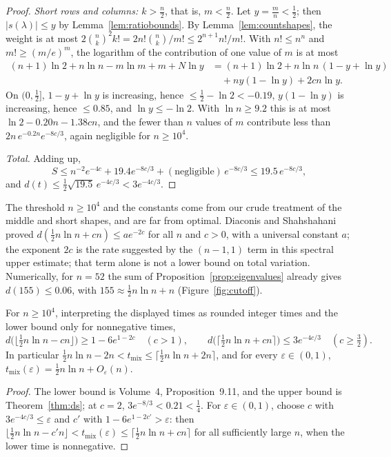 \begin{proof}
\emph{Short rows and columns: $k>\frac n2$}, that is, $m<\frac n2$. Let $y=\frac mn<\frac12$; then $|s(\lambda)|\le y$ by Lemma~\ref{lem:ratiobounds}. By Lemma~\ref{lem:countshapes}, the weight is at most $2\binom nk^2k!=2n!\binom nk/m!\le2^{n+1}n!/m!$. With $n!\le n^n$ and
$m!\ge(m/e)^m$, the logarithm of the contribution of one value of $m$ is at most
\[
\begin{aligned}(n+1)\ln2+n\ln n-m\ln m+m+N\ln y&=(n+1)\ln2+n\ln n\,(1-y+\ln y)\\&\quad+ny(1-\ln y)+2cn\ln y.\end{aligned}
\]
On $(0,\frac12]$, $1-y+\ln y$ is increasing, hence $\le\frac12-\ln2<-0.19$, $y(1-\ln y)$ is increasing, hence $\le0.85$, and $\ln y\le-\ln2$. With $\ln n\ge9.2$ this is at most $\ln2-0.20n-1.38cn$, and the fewer than $n$ values of $m$ contribute
less than $2n\,e^{-0.2n}e^{-8c/3}$, again negligible for $n\ge10^4$.

\emph{Total.} Adding up,
\[
S\le n^{-2}e^{-4c}+19.4e^{-8c/3}+(\text{negligible})\,e^{-8c/3}\le19.5\,e^{-8c/3},
\]
and $d(t)\le\frac12\sqrt{19.5}\,e^{-4c/3}<3e^{-4c/3}$.
\end{proof}

The threshold $n\ge10^4$ and the constants come from our crude treatment of the middle and short shapes, and are far from optimal. Diaconis and Shahshahani proved $d(\frac12n\ln n+cn)\le ae^{-2c}$ for all $n$ and $c>0$, with a universal constant $a$; the exponent $2c$
is the rate suggested by the $(n-1,1)$ term in this spectral upper estimate; that term alone is not a lower bound on total variation. Numerically, for $n=52$ the sum of Proposition~\ref{prop:eigenvalues} already gives $d(155)\le0.06$, with $155\approx\frac12n\ln n+n$ (Figure~\ref{fig:cutoff}).

\begin{corollary}\label{cor:cutoff}
For $n\ge10^4$, interpreting the displayed times as rounded integer times and the lower bound only for nonnegative times,
\[
d\bigl(\lfloor\tfrac12n\ln n-cn\rfloor\bigr)\ge1-6e^{1-2c}\quad(c>1),\qquad d\bigl(\lceil\tfrac12n\ln n+cn\rceil\bigr)\le3e^{-4c/3}\quad(c\ge\tfrac32).
\]
In particular $\frac12n\ln n-2n<t_{\mathrm{mix}}\le\lceil\frac12n\ln n+2n\rceil$, and for every $\varepsilon\in(0,1)$, $t_{\mathrm{mix}}(\varepsilon)=\frac12n\ln n+O_\varepsilon(n)$.
\end{corollary}

\begin{proof}
The lower bound is Volume~4, Proposition~9.11, and the upper bound is Theorem~\ref{thm:ds}; at $c=2$, $3e^{-8/3}<0.21<\frac14$. For $\varepsilon\in(0,1)$, choose $c$ with $3e^{-4c/3}\le\varepsilon$ and $c'$ with $1-6e^{1-2c'}>\varepsilon$: then
$\lfloor\frac12n\ln n-c'n\rfloor<t_{\mathrm{mix}}(\varepsilon)\le\lceil\frac12n\ln n+cn\rceil$ for all sufficiently large $n$, when the lower time is nonnegative.
\end{proof}

